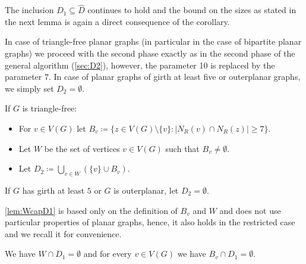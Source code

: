 The inclusion $D_1\subseteq \hat D$ continues to hold and the bound
on the sizes as stated in the next lemma is again a direct consequence of the corollary.

\smallskip
{}

In case of triangle-free planar graphs (in particular in the case of bipartite
planar graphs) we proceed with the second phase exactly as in the second phase of
the general algorithm (\cref{sec:D2}), however, the parameter 10 is replaced by
the parameter $7$. In  case of planar graphs of girth at least five or outerplanar
graphs, we simply set $D_2=\emptyset$.

\begin{tcolorbox}[colback=red!5!white,colframe=red!50!black]
  If $G$ is triangle-free:

  \begin{itemize}
    \item For $v\in V(G)$ let $B_v\coloneqq \{z\in V(G)\setminus
      \{v\}: |N_R(v)\cap N_R(z)|\geq 7\}$.\smallskip
    \item Let $W$ be the set of vertices $v\in V(G)$ such
      that $B_v \neq \emptyset$.\smallskip
    \item Let $D_2\coloneqq \bigcup\limits_{v\in W} (\{v\}\cup B_v)$.
  \end{itemize}

  If $G$ has girth at least $5$ or $G$ is outerplanar, let $D_2=\emptyset$.
\end{tcolorbox}

\cref{lem:WcapD1} is based only on the definition of $B_v$ and $W$ and
does not use particular properties of planar graphs, hence, it also holds
in the restricted case and we recall it for convenience.

\begin{lemma}\label{alem:WcapD1}
  We have $W\cap D_1=\emptyset$ and for every $v\in V(G)$ we have
  $B_v\cap D_1=\emptyset$.
\end{lemma}


